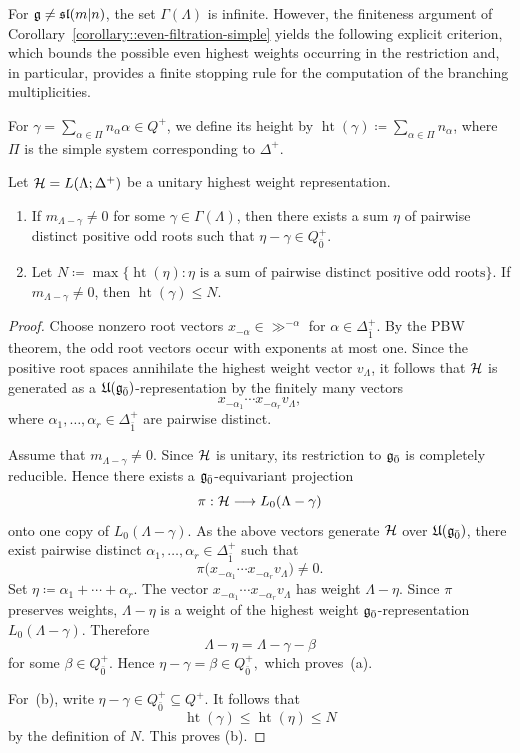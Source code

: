 For $\gg \neq \sl(m\vert n)$, the set $\Gamma(\Lambda)$ is infinite. However, the finiteness argument of Corollary~\ref{corollary::even-filtration-simple} yields the following explicit criterion, which bounds the possible even highest weights occurring in the restriction and, in particular, provides a finite stopping rule for the computation of the branching multiplicities.

For $\gamma=\sum_{\alpha\in\Pi}n_{\alpha}\alpha\in Q^{+}$, we define its height by $\operatorname{ht}(\gamma)\coloneqq\sum_{\alpha\in\Pi}n_{\alpha}$, where $\Pi$ is the simple system corresponding to $\Delta^{+}$.

\begin{lemma}\label{lemm::finite_stopping_branching}
Let $\HH=L(\Lambda;\Delta^{+})$ be a unitary highest weight representation.
\begin{enumerate}
\item[(a)] If $m_{\Lambda-\gamma}\neq0$ for some $\gamma\in\Gamma(\Lambda)$, then there exists a sum $\eta$ of pairwise distinct positive odd roots such that $\eta-\gamma\in Q_{\bar0}^{+}$.

\item[(b)] Let $N\coloneqq\max\{\operatorname{ht}(\eta):\eta\text{ is a sum of pairwise distinct positive odd roots}\}$. If $m_{\Lambda-\gamma}\neq0$, then $\operatorname{ht}(\gamma)\leq N$.
\end{enumerate}
\end{lemma}

\begin{proof}
Choose nonzero root vectors $x_{-\alpha}\in\gg^{-\alpha}$ for
$\alpha\in\Delta_{\bar1}^{+}$. By the PBW theorem, the odd root vectors
occur with exponents at most one. Since the positive root spaces
annihilate the highest weight vector $v_{\Lambda}$, it follows that
$\HH$ is generated as a $\UE(\even)$-representation by the finitely many vectors
\[
x_{-\alpha_1}\cdots x_{-\alpha_r}v_{\Lambda},
\]
where $\alpha_1,\ldots,\alpha_r\in\Delta_{\bar1}^{+}$ are pairwise
distinct.

Assume that $m_{\Lambda-\gamma}\neq0$. Since $\HH$ is unitary, its
restriction to $\even$ is completely reducible. Hence there exists a
$\even$-equivariant projection
\[
\pi:\HH\longrightarrow L_0(\Lambda-\gamma)
\]
onto one copy of $L_0(\Lambda-\gamma)$. As the above vectors generate
$\HH$ over $\UE(\even)$, there exist pairwise distinct
$\alpha_1,\ldots,\alpha_r\in\Delta_{\bar1}^{+}$ such that
\[
\pi\bigl(x_{-\alpha_1}\cdots x_{-\alpha_r}v_{\Lambda}\bigr)\neq0.
\]
Set $\eta\coloneqq\alpha_1+\cdots+\alpha_r$.
The vector
$x_{-\alpha_1}\cdots x_{-\alpha_r}v_{\Lambda}$ has weight
$\Lambda-\eta$. Since $\pi$ preserves weights, $\Lambda-\eta$ is a
weight of the highest weight $\even$-representation $L_0(\Lambda-\gamma)$.
Therefore
\[
\Lambda-\eta
=
\Lambda-\gamma-\beta
\]
for some $\beta\in Q_{\bar0}^{+}$. Hence
$
\eta-\gamma=\beta\in Q_{\bar0}^{+},
$
which proves~(a).

For~(b), write $\eta-\gamma\in Q_{\bar0}^{+}\subseteq Q^{+}$. It follows
that
\[
\operatorname{ht}(\gamma)
\leq
\operatorname{ht}(\eta) \leq N
\]
by the definition of $N$. This proves (b).
\end{proof}




